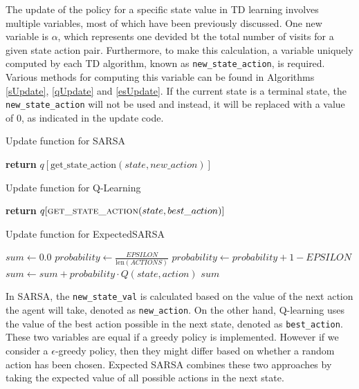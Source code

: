 The update of the policy for a specific state value in TD learning involves multiple variables, most of which have been previously discussed. One new variable is $\alpha$, which represents one devided bt the total number of visits for a given state action pair. Furthermore, to make this calculation, a variable uniquely computed by each TD algorithm, known as \texttt{new\_state\_action}, is required. Various methods for computing this variable can be found in Algorithms \ref{sUpdate}, \ref{qUpdate} and \ref{esUpdate}. If the current state is a terminal state, the \texttt{new\_state\_action} will not be used and instead, it will be replaced with a value of 0, as indicated in the update code.

\begin{algorithm}
\caption{Update function for SARSA}\label{sUpdate}
\begin{algorithmic}[1]
\State \textbf{return} $q[\text{get\_state\_action}(state, new\_action)]$
\EndFunction
\end{algorithmic}
\end{algorithm}

\begin{algorithm}
\caption{Update function for Q-Learning}\label{qUpdate}
\begin{algorithmic}[1]
\State \textbf{return} $q[\Call{get\_state\_action}{state, best\_action}]$
\EndFunction
\end{algorithmic}
\end{algorithm}

\begin{algorithm}
\caption{Update function for ExpectedSARSA}\label{esUpdate}
\begin{algorithmic}[1]
\State $sum \gets 0.0$
\State $probability \gets \frac{EPSILON}{\text{len}(ACTIONS)}$
\State $probability \gets probability + 1 - EPSILON$
\EndIf
\State $sum \gets sum + probability \cdot Q(state, action)$
\EndFor
\State \Return $sum$
\EndFunction
\end{algorithmic}
\end{algorithm}

In SARSA, the \texttt{new\_state\_val} is calculated based on the value of the next action the agent will take, denoted as \texttt{new\_action}. On the other hand, Q-learning uses the value of the best action possible in the next state, denoted as \texttt{best\_action}. These two variables are equal if a greedy policy is implemented. However if we consider a $\epsilon$-greedy policy, then they might differ based on whether a random action has been chosen. Expected SARSA combines these two approaches by taking the expected value of all possible actions in the next state. 

